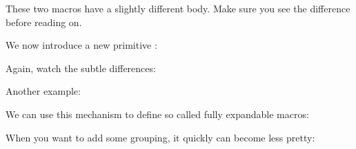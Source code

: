 \typebuffer[def] [option=TEX]
\typebuffer[edef][option=TEX]

\getbuffer[def]
\getbuffer[edef]

These two macros have a slightly different body. Make sure you see the
difference before reading on.

\luatokentable\TestA

\luatokentable\TestB

We now introduce a new primitive \type {\localcontrolled}:

\startbuffer[edef]
\edef{}
\stopbuffer

\startbuffer[ldef]
\edef{}
\stopbuffer

\typebuffer[edef][option=TEX]
\typebuffer[ldef][option=TEX]

\getbuffer[edef]
\getbuffer[ldef]

Again, watch the subtle differences:

\luatokentable\TestB

\luatokentable\TestC

Another example:

\startbuffer[edef]
\edef{}
\stopbuffer

\startbuffer[ldef]
\edef{}
\stopbuffer

\typebuffer[edef][option=TEX]
\typebuffer[ldef][option=TEX]

\getbuffer[edef]\getbuffer[ldef]

\luatokentable\TestB

\luatokentable\TestD

We can use this mechanism to define so called fully expandable macros:

\startbuffer[def]
\stopbuffer

\startbuffer[use]
\scratchdimen{}

\the\scratchdimen
\stopbuffer

\typebuffer[def][option=TEX]
\typebuffer[use][option=TEX]

\getbuffer[def]\getbuffer[use]

When you want to add some grouping, it quickly can become less pretty:

